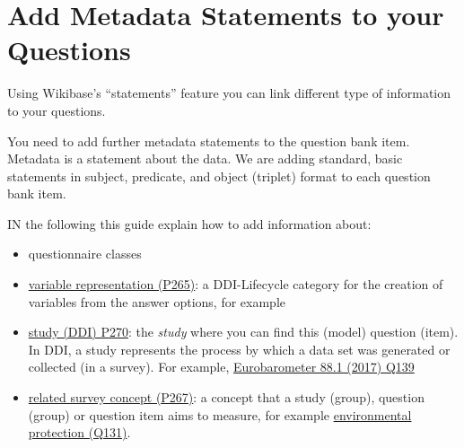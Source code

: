 \documentclass[
  letterpaper,
  DIV=11,
  numbers=noendperiod]{scrreprt}
\begin{document}
\begin{tcolorbox}[enhanced jigsaw, opacityback=0, bottomrule=.15mm, rightrule=.15mm, toptitle=1mm, breakable, colbacktitle=quarto-callout-note-color!10!white, colback=white, title=\textcolor{quarto-callout-note-color}{\faInfo}\hspace{0.5em}{When creating a ``question item'', using statements, always connect the
``question item'' to the ``model question''}, leftrule=.75mm, toprule=.15mm, left=2mm, arc=.35mm, colframe=quarto-callout-note-color-frame, coltitle=black, titlerule=0mm, bottomtitle=1mm, opacitybacktitle=0.6]

\end{tcolorbox}

\section{Add Metadata Statements to your
Questions}\label{add-metadata-statements-to-your-questions}

Using Wikibase's ``statements'' feature you can link different type of
information to your questions.

You need to add further metadata statements to the question bank item.
Metadata is a statement about the data. We are adding standard, basic
statements in subject, predicate, and object (triplet) format to each
question bank item.

IN the following this guide explain how to add information about:

\begin{itemize}
\item
  questionnaire classes
\item
  \href{https://reprexbase.eu/demowiki/index.php?title=Property:P265}{variable
  representation (P265)}: a DDI-Lifecycle category for the creation of
  variables from the answer options, for example
\item
  \href{https://reprexbase.eu/demowiki/index.php?title=Property:P270}{study
  (DDI) P270}: the \emph{study} where you can find this (model) question
  (item). In DDI, a study represents the process by which a data set was
  generated or collected (in a survey). For example,
  \href{https://reprexbase.eu/demowiki/index.php?title=Item:Q139}{Eurobarometer
  88.1 (2017) Q139}
\item
  \href{https://reprexbase.eu/demowiki/index.php?title=Property:P267}{related
  survey concept (P267)}: a concept that a study (group), question
  (group) or question item aims to measure, for example
  \href{https://reprexbase.eu/demowiki/index.php?title=Item:Q131}{environmental
  protection (Q131)}.
\end{itemize}
\end{document}
